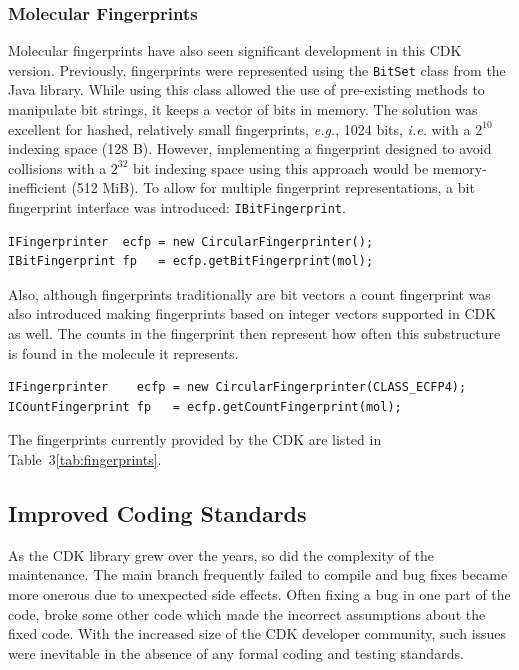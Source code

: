 \documentclass[doublespacing]{bmcart}
\begin{document}
\subsubsection*{Molecular Fingerprints}
Molecular fingerprints have also seen significant development in this CDK version.
Previously, fingerprints were represented using the \texttt{BitSet} class from
the Java library. While using this class
allowed the use of pre-existing methods to manipulate bit strings, it
keeps a vector of bits in memory. The solution was excellent for
hashed, relatively small fingerprints, \textit{e.g.}, 1024 bits,
\textit{i.e.} with a $2^{10}$ indexing space (128 B). However, implementing a
fingerprint designed to avoid collisions with a $2^{32}$ bit
indexing space using this approach would be memory-inefficient (512 MiB).
To allow for multiple fingerprint representations, a bit
fingerprint interface was introduced: \texttt{IBitFingerprint}.

\vspace{0.2cm}
\begin{verbatim}
IFingerprinter  ecfp = new CircularFingerprinter();
IBitFingerprint fp   = ecfp.getBitFingerprint(mol);
\end{verbatim}
\vspace{0.2cm}

Also, although fingerprints traditionally are bit vectors a count
fingerprint was also introduced making fingerprints based on integer
vectors supported in CDK as well. The counts in the fingerprint then 
represent how often this substructure is found in the molecule it
represents.

\vspace{0.2cm}
\begin{verbatim}
IFingerprinter    ecfp = new CircularFingerprinter(CLASS_ECFP4);
ICountFingerprint fp   = ecfp.getCountFingerprint(mol);
\end{verbatim}
\vspace{0.2cm}

The fingerprints currently provided by the CDK are listed in Table~3\ref{tab:fingerprints}.

\subsection*{Improved Coding Standards}

As the CDK library grew over the years, so did the complexity of the
maintenance. The main branch frequently failed to compile and bug
fixes became more onerous due to unexpected side effects.  Often
fixing a bug in one part of the code, broke some other code which made
the incorrect assumptions about the fixed code. With the increased size of
the CDK developer community, such issues were inevitable in the
absence of any formal coding and testing standards.
\end{document}
